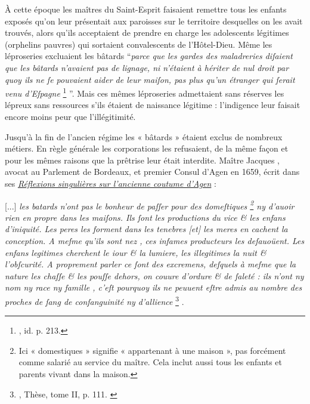  À cette époque les maîtres du Saint-Esprit faisaient remettre tous les enfants exposés qu'on leur présentait aux paroisses sur le territoire desquelles on les avait trouvés, alors qu'ils acceptaient de prendre en charge les adolescents légitimes (orphelins pauvres) qui sortaient convalescents de l'Hôtel-Dieu. Même les léproseries excluaient les bâtards \enquote{\emph{parce que les gardes des maladreries diſaient que les bâtards n'avaient pas de lignage, ni n'étaient à hériter de nul droit par quoy ils ne ſe pouvaient aider de leur maiſon, pas plus qu'un étranger qui ſerait venu d'Eſpagne}%
\footnote{, id. p. 213.}%
}. Mais ces mêmes léproseries admettaient sans réserves les lépreux sans ressources s'ils étaient de naissance légitime : l'indigence leur faisait encore moins peur que l'illégitimité.

 Jusqu'à la fin de l'ancien régime les « bâtards » étaient exclus de nombreux métiers. En règle générale les corporations les refusaient, de la même façon et pour les mêmes raisons que la prêtrise leur était interdite. Maître Jacques , avocat au Parlement de Bordeaux, et premier Consul d'Agen en 1659, écrit dans ses \href{http://www.babordnum.fr/files/original/859d36685f2d7b2f871c648ea08bd103.pdf}{\emph{Réflexions singulières sur l'ancienne coutume d'Agen}}  :
%
\begin{displayquote}

{[...] \emph{les batards n'ont pas le bonheur de paſſer pour des domeſtiques%
\footnote{Ici « domestiques » signifie « appartenant à une maison », pas forcément comme salarié au service du maître. Cela inclut aussi tous les enfants et parents vivant dans la maison.} 
ny d'auoir rien en propre dans les maiſons. Ils ſont les productions du vice \& les enfans d'iniquité. Les peres les forment dans les tenebres \emph{[et]} les meres en cachent la conception. A meſme qu'ils sont nez , ces infames producteurs les deſauoüent. Les enfans legitimes cherchent le iour \& la lumiere, les illegitimes la nuit \& l'obſcurité. A proprement parler ce ſont des excremens, deſquels à meſme que la nature les chaſſe \& les pouſſe dehors, on couure d'ordure \& de ſaleté : ils n'ont ny nom ny race ny famille , c'eſt pourquoy ils ne peuuent eſtre admis au nombre des proches de ſang de conſanguinité ny d'allience}}%
\footnote{, Thèse, tome II, p. 111.%
\label{notecapul111}}%
.

\end{displayquote}


